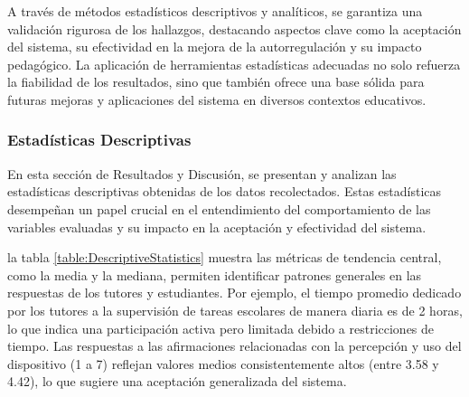 			A través de métodos estadísticos descriptivos y analíticos, se garantiza una validación rigurosa de los hallazgos, destacando aspectos clave como la aceptación del sistema, su efectividad en la mejora de la autorregulación y su impacto pedagógico. La aplicación de herramientas estadísticas adecuadas no solo refuerza la fiabilidad de los resultados, sino que también ofrece una base sólida para futuras mejoras y aplicaciones del sistema en diversos contextos educativos.
			
			\subsubsection{Estadísticas Descriptivas}
				En esta sección de Resultados y Discusión, se presentan y analizan las estadísticas descriptivas obtenidas de los datos recolectados. Estas estadísticas desempeñan un papel crucial en el entendimiento del comportamiento de las variables evaluadas y su impacto en la aceptación y efectividad del sistema.
				
				la tabla \ref{table:DescriptiveStatistics} muestra las métricas de tendencia central, como la media y la mediana, permiten identificar patrones generales en las respuestas de los tutores y estudiantes. Por ejemplo, el tiempo promedio dedicado por los tutores a la supervisión de tareas escolares de manera diaria es de 2 horas, lo que indica una participación activa pero limitada debido a restricciones de tiempo. Las respuestas a las afirmaciones relacionadas con la percepción y uso del dispositivo (1 a 7) reflejan valores medios consistentemente altos (entre 3.58 y 4.42), lo que sugiere una aceptación generalizada del sistema.
				
